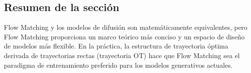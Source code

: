 \subsection{Resumen de la sección}

Flow Matching y los modelos de difusión son matemáticamente equivalentes, pero Flow Matching proporciona un marco teórico más conciso y un espacio de diseño de modelos más flexible. En la práctica, la estructura de trayectoria óptima derivada de trayectorias rectas (trayectoria OT) hace que Flow Matching sea el paradigma de entrenamiento preferido para los modelos generativos actuales.
